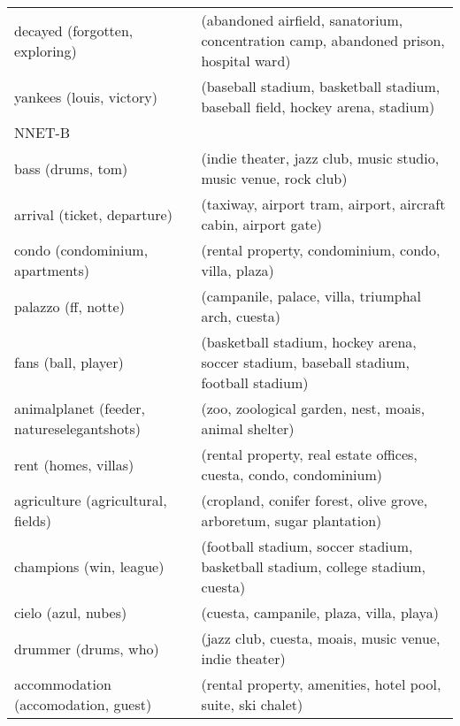 \begin{table}[]
\begin{tabular}{ll}
		decayed (forgotten, exploring)             & (abandoned airfield, sanatorium, concentration camp, abandoned prison, hospital ward)  \\
		yankees (louis, victory)                   & (baseball stadium, basketball stadium, baseball field, hockey arena, stadium)          \\
		NNET-B                                     &                                                                                        \\
		bass (drums, tom)                          & (indie theater, jazz club, music studio, music venue, rock club)                       \\
		arrival (ticket, departure)                & (taxiway, airport tram, airport, aircraft cabin, airport gate)                         \\
		condo (condominium, apartments)            & (rental property, condominium, condo, villa, plaza)                                    \\
		palazzo (ff, notte)                        & (campanile, palace, villa, triumphal arch, cuesta)                                     \\
		fans (ball, player)                        & (basketball stadium, hockey arena, soccer stadium, baseball stadium, football stadium) \\
		animalplanet (feeder, natureselegantshots) & (zoo, zoological garden, nest, moais, animal shelter)                                  \\
		rent (homes, villas)                       & (rental property, real estate offices, cuesta, condo, condominium)                     \\
		agriculture (agricultural, fields)         & (cropland, conifer forest, olive grove, arboretum, sugar plantation)                   \\
		champions (win, league)                    & (football stadium, soccer stadium, basketball stadium, college stadium, cuesta)        \\
		cielo (azul, nubes)                        & (cuesta, campanile, plaza, villa, playa)                                               \\
		drummer (drums, who)                       & (jazz club, cuesta, moais, music venue, indie theater)                                 \\
		accommodation (accomodation, guest)        & (rental property, amenities, hotel pool, suite, ski chalet)                            \\

\end{tabular}
\end{table}
